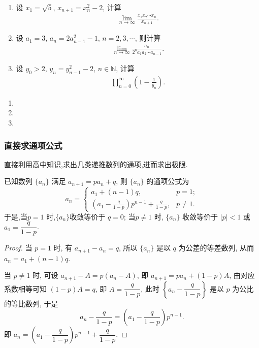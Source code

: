 \documentclass[../../main.tex]{subfiles}%
\begin{document}
\begin{example}
\begin{enumerate}
\item 设 $x_1 = \sqrt{5}$, $x_{n+1} = x_n^2 - 2$, 计算
\begin{align*}
\lim_{n \to \infty} \frac{x_1 x_2 \cdots x_n}{x_{n+1}}.
\end{align*}
\item 设 $a_1 = 3$, $a_n = 2a_{n-1}^2 - 1$, $n = 2, 3, \cdots$, 则计算
\begin{align*}
\lim_{n \to \infty} \frac{a_n}{2^n a_1 a_2 \cdots a_{n-1}}.
\end{align*}
\item 设 $y_0 > 2$, $y_n = y_{n-1}^2 - 2$, $n \in \mathbb{N}$, 计算
\begin{align*}
\prod_{n=0}^{\infty} \left(1 - \frac{1}{y_n}\right).
\end{align*}
\end{enumerate}
\end{example}
\begin{solution}
\begin{enumerate}
\item 

\item 

\item 
\end{enumerate}

\end{solution}


\subsubsection{直接求通项公式}

直接利用高中知识,求出几类递推数列的通项,进而求出极限.

\begin{proposition}\label{proposition:可直接求通项--类型一}
已知数列 $\{a_n\}$ 满足 $a_{n+1} = p a_n + q$, 则 $\{a_n\}$ 的通项公式为
\[
a_n = 
\begin{cases} 
a_1 + (n - 1)q, & p = 1; \\
\displaystyle \left( a_1 - \frac{q}{1 - p} \right) p^{n - 1} + \frac{q}{1 - p}, & p \neq 1.
\end{cases}
\]
于是,当$p = 1$ 时,$\{a_n\}$收敛等价于 $q = 0$;
当$p \neq 1$ 时, $\{a_n\}$ 收敛等价于 $|p| < 1$ 或 $a_1 = \dfrac{q}{1 - p}$.
\end{proposition}
\begin{proof}
当 $p = 1$ 时, 有 $a_{n + 1} - a_n = q$, 所以 $\{a_n\}$ 是以 $q$ 为公差的等差数列, 从而 $a_n = a_1 + (n - 1)q$.

当 $p \neq 1$ 时, 可设 $a_{n + 1} - A = p(a_n - A)$, 即 $a_{n + 1} = p a_n + (1 - p)A$, 由对应系数相等可知 $(1 - p)A = q$, 即 $A = \dfrac{q}{1 - p}$, 此时 $\left\{ a_n - \dfrac{q}{1 - p} \right\}$ 是以 $p$ 为公比的等比数列, 于是
\[
a_n - \frac{q}{1 - p} = \left( a_1 - \frac{q}{1 - p} \right) p^{n - 1}.
\]
即 $a_n = \left( a_1 - \dfrac{q}{1 - p} \right) p^{n - 1} + \dfrac{q}{1 - p}$. 
\end{proof}
\end{document}
